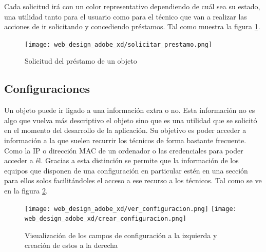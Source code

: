 Cada solicitud irá con un color representativo dependiendo de cuál sea su estado, una utilidad tanto para el usuario como para el técnico que van a realizar las acciones de ir solicitando y concediendo préstamos. Tal como muestra la figura \ref{solicitar_prestamos_design}.

\begin{figure}[ht]
    \centering
    \texttt{[image: web\_design\_adobe\_xd/solicitar\_prestamo.png]}
    \caption{Solicitud del préstamo de un objeto}\label{solicitar_prestamos_design}
\end{figure}

\subsection{Configuraciones}

Un objeto puede ir ligado a una información extra o no. Esta información no es algo que vuelva más descriptivo el objeto sino que es una utilidad que se solicitó en el momento del desarrollo de la aplicación. Su objetivo es poder acceder a información a la que suelen recurrir los técnicos de forma bastante frecuente. Como la IP o dirección MAC de un ordenador o las credenciales para poder acceder a él. Gracias a esta distinción se permite que la información de los equipos que disponen de una configuración en particular estén en una sección para ellos solos facilitándoles el acceso a ese recurso a los técnicos. Tal como se ve en la figura \ref{configuracion_design}.

\begin{figure}[ht]
    \centering
    \texttt{[image: web\_design\_adobe\_xd/ver\_configuracion.png]}
    \texttt{[image: web\_design\_adobe\_xd/crear\_configuracion.png]}
    \caption{Visualización de los campos de configuración a la izquierda y creación de estos a la derecha}\label{configuracion_design}
\end{figure}